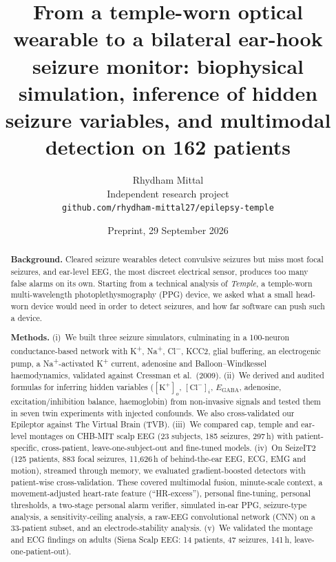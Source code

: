 \documentclass[11pt,a4paper]{article}
\title{\textbf{From a temple-worn optical wearable to a bilateral ear-hook seizure monitor: biophysical simulation, inference of hidden seizure variables, and multimodal detection on 162 patients}}
\author{Rhydham Mittal\\[2pt]\small Independent research project\\\small\texttt{github.com/rhydham-mittal27/epilepsy-temple}}
\date{Preprint, 29 September 2026}
\newcommand{\Kp}{K\textsuperscript{+}}
\newcommand{\Nap}{Na\textsuperscript{+}}
\newcommand{\Clm}{Cl\textsuperscript{$-$}}
\newcommand{\Ko}{$[\mathrm{K}^+]_o$}
\newcommand{\Cli}{$[\mathrm{Cl}^-]_i$}
\newcommand{\EGABA}{$E_{\mathrm{GABA}}$}
\begin{document}
\maketitle

\begin{abstract}
\noindent\textbf{Background.} Cleared seizure wearables detect convulsive seizures but miss most focal seizures, and ear-level EEG, the most discreet electrical sensor, produces too many false alarms on its own. Starting from a technical analysis of \emph{Temple}, a temple-worn multi-wavelength photoplethysmography (PPG) device, we asked what a small head-worn device would need in order to detect seizures, and how far software can push such a device.

\noindent\textbf{Methods.} (i)~We built three seizure simulators, culminating in a 100-neuron conductance-based network with \Kp, \Nap, \Clm, KCC2, glial buffering, an electrogenic pump, a \Nap-activated \Kp{} current, adenosine and Balloon--Windkessel haemodynamics, validated against Cressman et al.\ (2009). (ii)~We derived and audited formulas for inferring hidden variables (\Ko, \Cli, \EGABA, adenosine, excitation/inhibition balance, haemoglobin) from non-invasive signals and tested them in seven twin experiments with injected confounds. We also cross-validated our Epileptor against The Virtual Brain (TVB). (iii)~We compared cap, temple and ear-level montages on CHB-MIT scalp EEG (23 subjects, 185 seizures, 297\,h) with patient-specific, cross-patient, leave-one-subject-out and fine-tuned models. (iv)~On SeizeIT2 (125 patients, 883 focal seizures, 11,626\,h of behind-the-ear EEG, ECG, EMG and motion), streamed through memory, we evaluated gradient-boosted detectors with patient-wise cross-validation. These covered multimodal fusion, minute-scale context, a movement-adjusted heart-rate feature (``HR-excess''), personal fine-tuning, personal thresholds, a two-stage personal alarm verifier, simulated in-ear PPG, seizure-type analysis, a sensitivity-ceiling analysis, a raw-EEG convolutional network (CNN) on a 33-patient subset, and an electrode-stability analysis. (v)~We validated the montage and ECG findings on adults (Siena Scalp EEG: 14 patients, 47 seizures, 141\,h, leave-one-patient-out).


\end{abstract}
\end{document}
